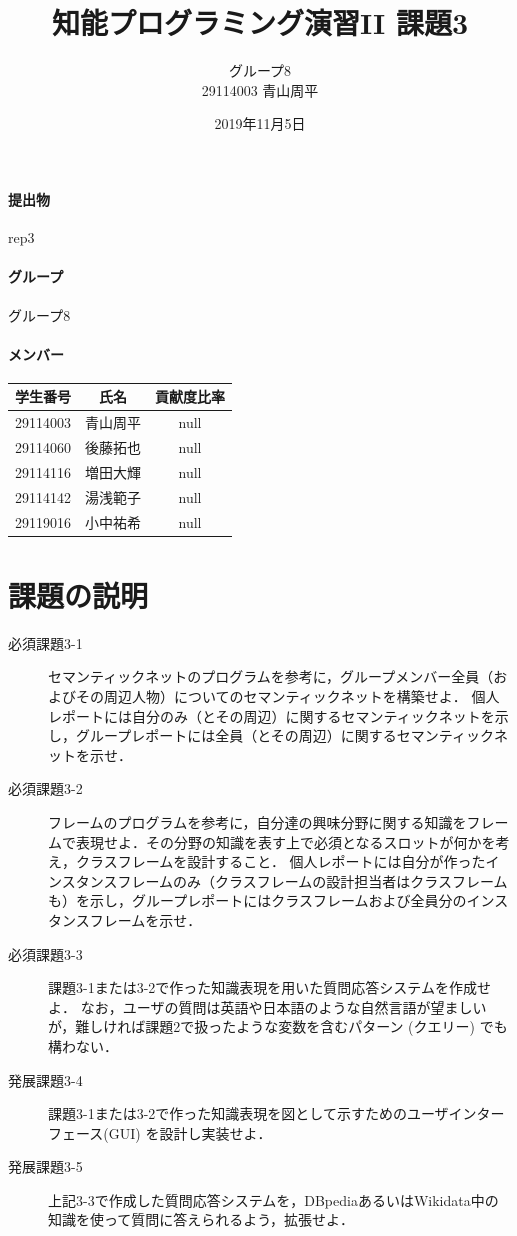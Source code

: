 \documentclass[12pt]{jarticle}
\title{知能プログラミング演習II 課題3}
\author{グループ8\\
  29114003 青山周平\\
}
\date{2019年11月5日}
\begin{document}
\maketitle

\paragraph{提出物} rep3
\paragraph{グループ} グループ8
\paragraph{メンバー}
\begin{tabular}{|c|c|c|}
  \hline
  学生番号&氏名&貢献度比率\\
  \hline\hline
  29114003&青山周平&null\\
  \hline
  29114060&後藤拓也&null\\
  \hline
  29114116&増田大輝&null\\
  \hline
  29114142&湯浅範子&null\\
  \hline
  29119016&小中祐希&null\\
  \hline
\end{tabular}



\section{課題の説明}
\begin{description}
\item[必須課題3-1] セマンティックネットのプログラムを参考に，グループメンバー全員（およびその周辺人物）についてのセマンティックネットを構築せよ．
個人レポートには自分のみ（とその周辺）に関するセマンティックネットを示し，グループレポートには全員（とその周辺）に関するセマンティックネットを示せ．
\item[必須課題3-2] フレームのプログラムを参考に，自分達の興味分野に関する知識をフレームで表現せよ．その分野の知識を表す上で必須となるスロットが何かを考え，クラスフレームを設計すること．
個人レポートには自分が作ったインスタンスフレームのみ（クラスフレームの設計担当者はクラスフレームも）を示し，グループレポートにはクラスフレームおよび全員分のインスタンスフレームを示せ．
\item[必須課題3-3] 課題3-1または3-2で作った知識表現を用いた質問応答システムを作成せよ．
なお，ユーザの質問は英語や日本語のような自然言語が望ましいが，難しければ課題2で扱ったような変数を含むパターン (クエリー) でも構わない． 
\item[発展課題3-4] 課題3-1または3-2で作った知識表現を図として示すためのユーザインターフェース(GUI) を設計し実装せよ．
\item[発展課題3-5] 上記3-3で作成した質問応答システムを，DBpediaあるいはWikidata中の知識を使って質問に答えられるよう，拡張せよ．
\end{description}
\end{document}
